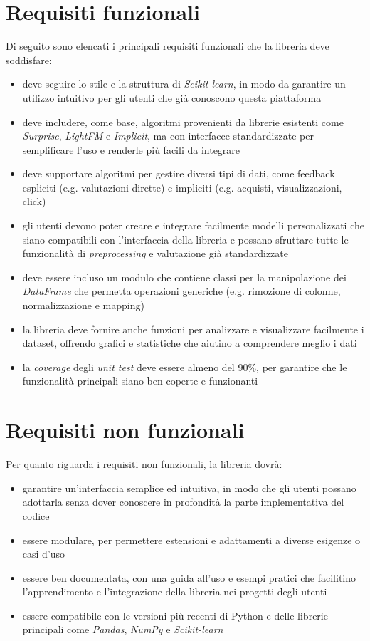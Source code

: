 \section{Requisiti funzionali}

Di seguito sono elencati i principali requisiti funzionali che la libreria deve soddisfare:

\begin{itemize}
    \item deve seguire lo stile e la struttura di \textit{Scikit-learn}, in modo da garantire un utilizzo intuitivo per gli utenti che già conoscono questa piattaforma
    \item deve includere, come base, algoritmi provenienti da librerie esistenti come \textit{Surprise}, \textit{LightFM} e \textit{Implicit}, ma con interfacce standardizzate per semplificare l'uso e renderle più facili da integrare
    \item deve supportare algoritmi per gestire diversi tipi di dati, come feedback espliciti (e.g. valutazioni dirette) e impliciti (e.g. acquisti, visualizzazioni, click)
    \item gli utenti devono poter creare e integrare facilmente modelli personalizzati che siano compatibili con l'interfaccia della libreria e possano sfruttare tutte le funzionalità di \textit{preprocessing} e valutazione già standardizzate
    \item deve essere incluso un modulo che contiene classi per la manipolazione dei \textit{DataFrame} che permetta operazioni generiche (e.g. rimozione di colonne, normalizzazione e mapping)
    \item la libreria deve fornire anche funzioni per analizzare e visualizzare facilmente i dataset, offrendo grafici e statistiche che aiutino a comprendere meglio i dati
    \item la \textit{coverage} degli \textit{unit test} deve essere almeno del 90\%, per garantire che le funzionalità principali siano ben coperte e funzionanti
\end{itemize}

\section{Requisiti non funzionali}

Per quanto riguarda i requisiti non funzionali, la libreria dovrà:

\begin{itemize}
    \item garantire un'interfaccia semplice ed intuitiva, in modo che gli utenti possano adottarla senza dover conoscere in profondità la parte implementativa del codice
    \item essere modulare, per permettere estensioni e adattamenti a diverse esigenze o casi d'uso
    \item essere ben documentata, con una guida all'uso e esempi pratici che facilitino l'apprendimento e l'integrazione della libreria nei progetti degli utenti
    \item essere compatibile con le versioni più recenti di Python e delle librerie principali come \textit{Pandas}, \textit{NumPy} e \textit{Scikit-learn}
\end{itemize}

